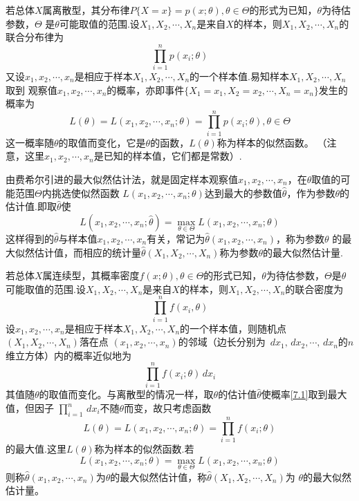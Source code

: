 \begin{definition}[最大似然估计法]
    若总体$X$属离散型，其分布律$P\{X=x\}=p(x;\theta),\theta\in \varTheta$的形式为已知，$\theta$为待估参数，$\varTheta$
    是$\theta$可能取值的范围.设$X_1,X_2,\cdots,X_n$是来自$X$的样本，则$X_1,X_2,\cdots,X_n$的联合分布律为
    $$\prod_{i=1}^np(x_i;\theta)$$
    又设$x_1,x_2,\cdots,x_n$是相应于样本$X_1,X_2,\cdots,X_n$的一个样本值.易知样本$X_1,X_2,\cdots,X_n$取到
    观察值$x_1,x_2,\cdots,x_n$的概率，亦即事件$\{X_1=x_1,X_2=x_2,\cdots,X_n=x_n\}$发生的概率为
    $$L(\theta)=L(x_1,x_2,\cdots,x_n;\theta)=\prod_{i=1}^np(x_i;\theta),\theta\in\varTheta$$
    这一概率随$\theta$的取值而变化，它是$\theta$的函数，$L(\theta)$称为样本的{\heiti 似然函数}。
    （注意，这里$x_1,x_2,\cdots,x_n$是已知的样本值，它们都是常数）.

    由费希尔引进的最大似然估计法，就是固定样本观察值$x_1,x_2,\cdots,x_n$，在$\theta$取值的可能范围$\varTheta$内挑选使似然函数
    $L(x_1,x_2,\cdots,x_n;\theta)$达到最大的参数值$\hat{\theta}$，作为参数$\theta$的估计值.即取$\hat{\theta}$使
    $$L(x_1,x_2,\cdots,x_n;\hat{\theta})=\max\limits_{\theta\in\varTheta}L(x_1,x_2,\cdots,x_n;\theta)$$
    这样得到的$\hat{\theta}$与样本值$x_1,x_2,\cdots,x_n$有关，常记为$\hat{\theta}(x_1,x_2,\cdots,x_n)$，称为参数$\theta$
    的{\heiti 最大似然估计值}，而相应的统计量$\hat{\theta}(X_1,X_2,\cdots,X_n)$称为参数$\theta$的{\heiti 最大似然估计量}.

    若总体$X$属连续型，其概率密度$f(x;\theta),\theta\in\varTheta$的形式已知，$\theta$为待估参数，$\varTheta$是$\theta$
    可能取值的范围.设$X_1,X_2,\cdots,X_n$是来自$X$的样本，则$X_1,X_2,\cdots,X_n$的联合密度为
    $$\prod_{i=1}^nf(x_i,\theta)$$
    设$x_1,x_2,\cdots,x_n$是相应于样本$X_1,X_2,\cdots,X_n$的一个样本值，则随机点$(X_1,X_2,\cdots,X_n)$落在点
    $(x_1,x_2,\cdots,x_n)$的邻域（边长分别为    $\,dx_1,\,dx_2,\cdots,\,dx_n$的$n$维立方体）内的概率近似地为
    \begin{equation}\tag{1}\label{7.1}
    \prod_{i=1}^nf(x_i;\theta)\,dx_i
    \end{equation}
    其值随$\theta$的取值而变化。与离散型的情况一样，取$\theta$的估计值$\hat{\theta}$使概率\eqref{7.1}取到最大值，但因子
    $\displaystyle{\prod_{i=1}^n\,dx_i}$不随$\theta$而变，故只考虑函数
    $$L(\theta)=L(x_1,x_2,\cdots,x_n;\theta)=\prod_{i=1}^nf(x_i;\theta)$$
    的最大值.这里$L(\theta)$称为样本的{\heiti 似然函数}.若
    $$L(x_1,x_2,\cdots,x_n;\theta)=\max\limits_{\theta\in \varTheta}L(x_1,x_2,\cdots,x_n;\theta)$$
    则称$\hat{\theta}(x_1,x_2,\cdots,x_n)$为$\theta$的{\heiti 最大似然估计值}，称$\hat{\theta}(X_1,X_2,\cdots,X_n)$为
    $\theta$的{\heiti 最大似然估计量}。
\end{definition}
